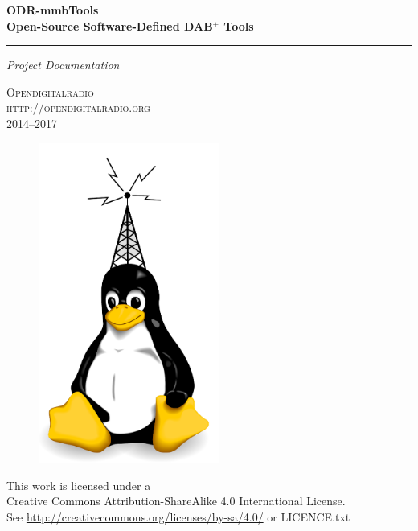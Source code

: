 \documentclass[a4paper,oneside,10pt]{article}
\newcommand{\dabplus}{DAB$^\mathrm{+}$\xspace}
\newcommand{\titleinfo}{ODR-mmbTools \\
Open-Source Software-Defined \dabplus Tools}
\begin{document}
 \begin{titlepage}
    \null\vfil
    \begin{flushleft}
      \huge \textbf{\titleinfo}
    \end{flushleft}
    \par
    \hrule height 4pt
    \par
    \begin{flushright}
      \large
      \textsl{Project Documentation} \par
    \end{flushright}
    \vspace{\fill}

    \begin{center}
        \Large
        \textsc{Opendigitalradio\\\href{http://opendigitalradio.org}{http://opendigitalradio.org}\\2014--2017}
    \end{center}
    \vspace{\fill}

    \begin{figure}[!h]
        \centering
        \parbox{2.2in}{\includegraphics[width=16em]{figures/dabtux.pdf}}
    \end{figure}

    \vspace*{1cm}
    \begin{center}
    This work is licensed under a \\
    Creative Commons Attribution-ShareAlike 4.0 International License.\\
    See \url{http://creativecommons.org/licenses/by-sa/4.0/} or LICENCE.txt
    \end{center}
 \end{titlepage}
\end{document}
